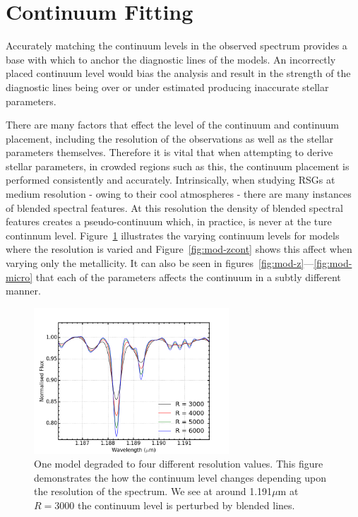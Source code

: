 \section{Continuum Fitting} %
\label{sub:continuum_fitting}

Accurately matching the continuum levels in the observed
spectrum provides a base with which to anchor the diagnostic lines of the models.
An incorrectly placed continuum level would bias the analysis and result in the
strength of the diagnostic lines being over or under estimated producing inaccurate stellar parameters.

There are many factors that effect the level of the continuum and continuum placement,
including the resolution of the observations as well as the stellar parameters themselves.
Therefore it is vital that when attempting to derive stellar parameters,
in crowded regions such as this, the continuum placement is performed
consistently and accurately.
Intrinsically, when studying RSGs at medium resolution - owing  to their cool atmospheres -
there are many instances of blended spectral features.
At this resolution the density of blended spectral features creates a pseudo-continuum which, in practice,
is never at the ture continnum level.
Figure~\ref{fig:mod-res} illustrates the varying continuum levels for models where the resolution is varied and
Figure~\ref{fig:mod-zcont} shows this affect when varying only the metallicity.
It can also be seen in figures~\ref{fig:mod-z}---\ref{fig:mod-micro} that each of the parameters affects the continuum in a subtly different manner.

\begin{figure}
 \centering
\includegraphics[width=0.65\textwidth]{JAnal/Resolution}
\caption{
One model degraded to four different resolution values.
This figure demonstrates the how the continuum level changes depending upon
the resolution of the spectrum.
We see at around 1.191$\mu$m at $R=3000$ the continuum level is perturbed by blended lines.\label{fig:mod-res}
         }
\end{figure}

